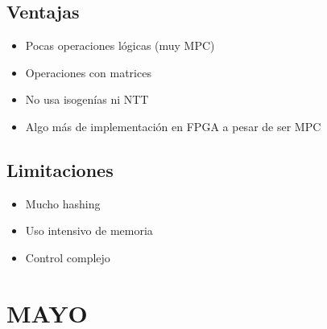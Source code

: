 \subsection*{Ventajas}
\begin{itemize}
\item Pocas operaciones lógicas (muy MPC)
\item Operaciones con matrices
\item No usa isogenías ni NTT
\item Algo más de implementación en FPGA a pesar de ser MPC
\end{itemize}

\subsection*{Limitaciones}
\begin{itemize}
\item Mucho hashing
\item Uso intensivo de memoria
\item Control complejo
\end{itemize}

\section{MAYO}

